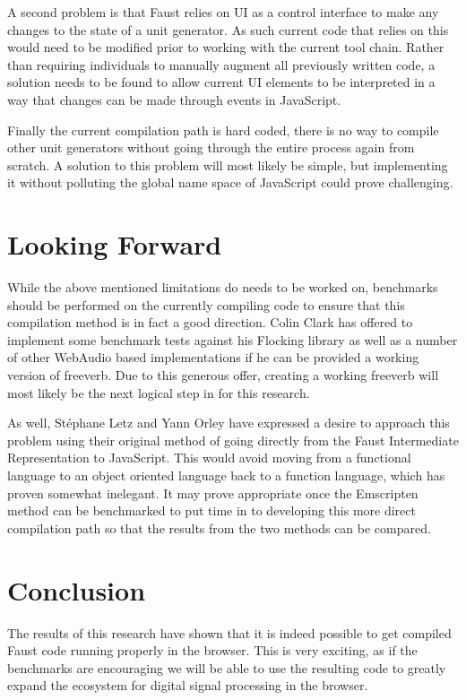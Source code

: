 \documentclass[runningheads,a4paper]{llncs}
\begin{document}
A second problem is that Faust relies on UI as a control interface to make any changes to the state of a unit generator.  As such current code that relies on this would need to be modified prior to working with the current tool chain.  Rather than requiring individuals to manually augment all previously written code, a solution needs to be found to allow current UI elements to be interpreted in a way that changes can be made through events in JavaScript.

Finally the current compilation path is hard coded, there is no way to compile other unit generators without going through the entire process again from scratch.  A solution to this problem will most likely be simple, but implementing it without polluting the global name space of JavaScript could prove challenging.

\section{Looking Forward}

While the above mentioned limitations do needs to be worked on, benchmarks should be performed on the currently compiling code to ensure that this compilation method is in fact a good direction.  Colin Clark has offered to implement some benchmark tests against his Flocking library as well as a number of other WebAudio based implementations if he can be provided a working version of freeverb.  Due to this generous offer, creating a working freeverb will most likely be the next logical step in for this research.

As well, St\'{e}phane Letz and Yann Orley have expressed a desire to approach this problem using their original method of going directly from the Faust Intermediate Representation to JavaScript.  This would avoid moving from a functional language to an object oriented language back to a function language, which has proven somewhat inelegant.  It may prove appropriate once the Emscripten method can be benchmarked to put time in to developing this more direct compilation path so that the results from the two methods can be compared.

\section{Conclusion}

The results of this research have shown that it is indeed possible to get compiled Faust code running properly in the browser.  This is very exciting, as if the benchmarks are encouraging we will be able to use the resulting code to greatly expand the ecosystem for digital signal processing in the browser.
\end{document}
